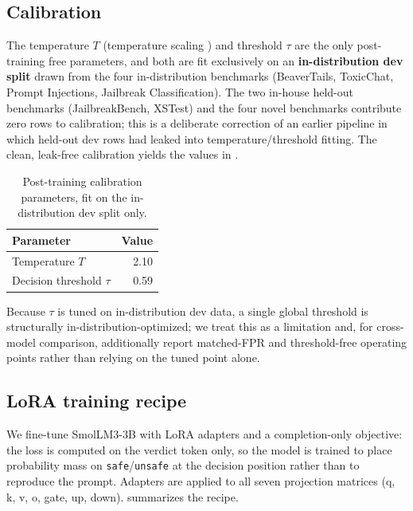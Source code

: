 \documentclass[sigconf,nonacm]{acmart}
\begin{document}
\subsection{Calibration}

The temperature $T$ (temperature scaling \cite{guo2017calibration}) and threshold $\tau$ are the only post-training free parameters, and both are fit exclusively on an \textbf{in-distribution dev split} drawn from the four in-distribution benchmarks (BeaverTails, ToxicChat, Prompt Injections, Jailbreak Classification). The two in-house held-out benchmarks (JailbreakBench, XSTest) and the four novel benchmarks contribute zero rows to calibration; this is a deliberate correction of an earlier pipeline in which held-out dev rows had leaked into temperature/threshold fitting. The clean, leak-free calibration yields the values in .

\begin{table}[t]
\small
\centering
\caption{Post-training calibration parameters, fit on the in-distribution dev split only.}
\label{tab:calibration}
\begin{tabular}{lr}
\toprule
Parameter & Value \\
\midrule
Temperature $T$ & 2.10 \\
Decision threshold $\tau$ & 0.59 \\
\bottomrule
\end{tabular}
\end{table}

Because $\tau$ is tuned on in-distribution dev data, a single global threshold is structurally in-distribution-optimized; we treat this as a limitation and, for cross-model comparison, additionally report matched-FPR and threshold-free operating points rather than relying on the tuned point alone.

\subsection{LoRA training recipe}

We fine-tune SmolLM3-3B \cite{bakouch2025smollm3} with LoRA adapters \cite{hu2021lora} and a completion-only objective: the loss is computed on the verdict token only, so the model is trained to place probability mass on \texttt{safe}/\texttt{unsafe} at the decision position rather than to reproduce the prompt. Adapters are applied to all seven projection matrices (q, k, v, o, gate, up, down).  summarizes the recipe.
\end{document}
